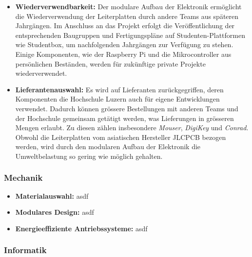 \documentclass[../../main.tex]{subfiles} %
\begin{document}
\begin{itemize}
  \item \textbf{Wiederverwendbarkeit:} Der modulare Aufbau der Elektronik ermöglicht die
        Wiederverwendung der Leiterplatten durch andere Teams aus späteren Jahrgängen. Im 
        Anschluss an das Projekt erfolgt die Veröffentlichung der entsprechenden Baugruppen 
        und Fertigungspläne auf Studenten-Plattformen wie Studentbox, um nachfolgenden 
        Jahrgängen zur Verfügung zu stehen. Einige Komponenten, wie der Raspberry Pi und 
        die Mikrocontroller aus persönlichen Beständen, werden für zukünftige private 
        Projekte wiederverwendet.

  \item \textbf{Lieferantenauswahl:} Es wird auf Lieferanten zurückgegriffen, deren Komponenten
        die Hochschule Luzern auch für eigene Entwicklungen verwendet. Dadurch können grössere Bestellungen mit
        anderen Teams und der Hochschule gemeinsam getätigt werden, was Lieferungen in grösseren Mengen erlaubt.
        Zu diesen zählen insbesondere \textit{Mouser}, \textit{DigiKey} und \textit{Conrad}.
        Obwohl die Leiterplatten vom asiatischen Hersteller JLCPCB bezogen werden, wird durch den modularen
        Aufbau der Elektronik die Umweltbelastung so gering wie möglich gehalten.
\end{itemize}

\subsubsection{Mechanik}

\begin{itemize}
  \item \textbf{Materialauswahl:} asdf
  \item \textbf{Modulares Design:} asdf
  \item \textbf{Energieeffiziente Antriebssysteme:} asdf
\end{itemize}

\subsubsection{Informatik}
\end{document}
